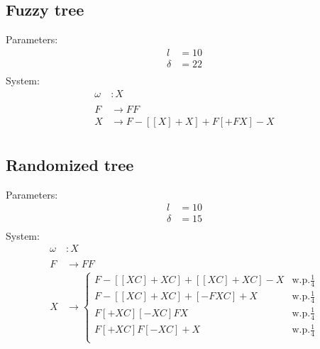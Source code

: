 \documentclass[10pt, letterpaper, twoside]{article}
\begin{document}
\begin{multicols}{2}
\subsection{Fuzzy tree}\label{app:fuzzy}
Parameters:
\begin{equation}
    \begin{aligned}
        l & =10 \\
        \delta & = 22 \\
    \end{aligned}
\end{equation}
System:
\begin{equation}
    \begin{aligned}
        \omega & : X \\
        \\
        F & \rightarrow FF \\
        X & \rightarrow F-[[X]+X]+F[+FX]-X \\
    \end{aligned}
\end{equation}

\subsection{Randomized tree}\label{app:fuzzy}
Parameters:
\begin{equation}
    \begin{aligned}
        l & =10 \\
        \delta & = 15 \\
    \end{aligned}
\end{equation}
System:
\begin{equation}
    \begin{aligned}
        \omega & : X \\
        \\
        F & \rightarrow FF \\
        X & \rightarrow \begin{cases}
            F-[[XC]+XC]+[[XC]+XC]-X & \text{w.p.} \frac{1}{4} \\
            F-[[XC]+XC]+[-FXC]+X & \text{w.p.} \frac{1}{4} \\
            F[+XC][-XC]FX & \text{w.p.} \frac{1}{4} \\
            F[+XC]F[-XC]+X & \text{w.p.} \frac{1}{4} \\
        \end{cases}
    \end{aligned}
\end{equation}
\end{multicols}
\end{document}
